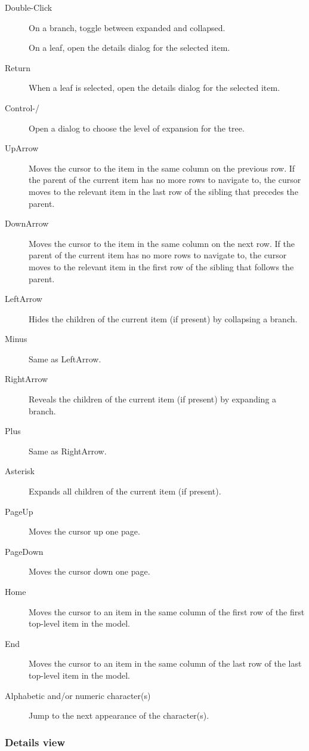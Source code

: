 \documentclass[]{article}
\begin{document}
\begin{description}
\item[Double-Click]
On a branch, toggle between expanded and collapsed.

On a leaf, open the details dialog for the selected item.
\item[Return]
When a leaf is selected, open the details dialog for the selected item.
\item[Control-/]
Open a dialog to choose the level of expansion for the tree.
\item[UpArrow]
Moves the cursor to the item in the same column on the previous row. If
the parent of the current item has no more rows to navigate to, the
cursor moves to the relevant item in the last row of the sibling that
precedes the parent.
\item[DownArrow]
Moves the cursor to the item in the same column on the next row. If the
parent of the current item has no more rows to navigate to, the cursor
moves to the relevant item in the first row of the sibling that follows
the parent.
\item[LeftArrow]
Hides the children of the current item (if present) by collapsing a
branch.
\item[Minus]
Same as LeftArrow.
\item[RightArrow]
Reveals the children of the current item (if present) by expanding a
branch.
\item[Plus]
Same as RightArrow.
\item[Asterisk]
Expands all children of the current item (if present).
\item[PageUp]
Moves the cursor up one page.
\item[PageDown]
Moves the cursor down one page.
\item[Home]
Moves the cursor to an item in the same column of the first row of the
first top-level item in the model.
\item[End]
Moves the cursor to an item in the same column of the last row of the
last top-level item in the model.

\item[Alphabetic and/or numeric character(s)]
Jump to the next appearance of the character(s).
\end{description}

\subsubsection{Details view}
\end{document}
